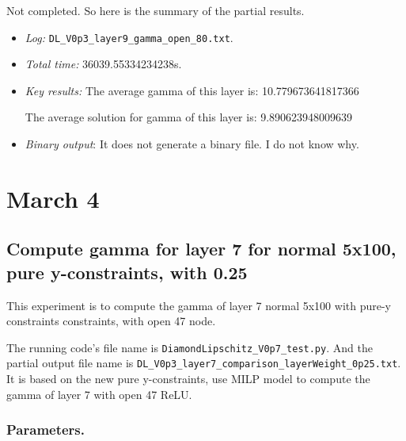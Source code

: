 \documentclass{llncs}
\begin{document}
Not completed. So here is the summary of the partial results.

\begin{itemize}
	\item \emph{Log:} \verb*|DL_V0p3_layer9_gamma_open_80.txt|.
	
	\item \emph{Total time:} 36039.55334234238s.
	
	\item \emph{Key results:}  The average gamma of this layer is:  10.779673641817366
	
	The average solution for gamma of this layer is:  9.890623948009639
	
	\item  \emph{Binary output}: It does not generate a binary file. I do not know why.
	
\end{itemize}

\section{March 4}


\subsection{Compute gamma for layer 7 for normal 5x100, pure y-constraints, with 0.25}

This experiment is to compute the gamma of layer 7 normal 5x100 with pure-y constraints constraints, with open 47 node.

\vspace*{1ex}

The running code's file name is \verb*|DiamondLipschitz_V0p7_test.py|. And the partial output file name is \verb*|DL_V0p3_layer7_comparison_layerWeight_0p25.txt|.  It is based on the new pure y-constraints, use MILP model to compute the gamma of layer 7 with open 47 ReLU.

\subsubsection*{Parameters.}
\end{document}
